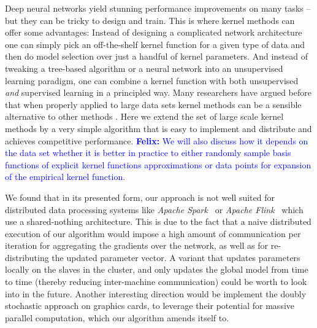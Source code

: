 \documentclass{article} %
\newcommand{\felix}[1]{\textcolor{blue}{{\bf Felix:} #1}}
\begin{document}

Deep neural networks yield stunning performance improvements on many tasks -- but they can be tricky to design and train.
This is where kernel methods can offer some advantages: Instead of designing a complicated network architecture one can simply pick an off-the-shelf kernel function for a given type of data and then do model selection over just a handful of kernel parameters. And instead of tweaking a tree-based algorithm or a neural network into an unsupervised learning paradigm, one can combine a kernel function with both unsupervised {\em and} supervised learning in a principled way.  
Many researchers have argued before that when properly applied to large data sets kernel methods can be a sensible alternative to other methods \cite{Lu2014}. Here we extend the set of large scale kernel methods by a very simple algorithm that is easy to implement and distribute and achieves competitive performance. 
\felix{We will also discuss how it depends on the data set whether it is better in practice to either randomly sample basis functions of explicit kernel functions approximations or data points for expansion of the empirical kernel function. }

We found that in its presented form, our approach is not well suited for distributed data processing systems like \textit{Apache Spark}~\cite{Zaharia2012} or \textit{Apache Flink}~\cite{Alexandrov2014} which use a shared-nothing architecture. This is due to the fact that a naive distributed execution of our algorithm would impose a high amount of communication per iteration for aggregating the gradients over the network, as well as for re-distributing the updated parameter vector. A variant that updates parameters locally on the slaves in the cluster, and only updates the global model from time to time (thereby reducing inter-machine communication) could be worth to look into in the future. Another interesting direction would be implement the doubly stochastic approach on graphics cards, to leverage their potential for massive parallel computation, which our algorithm amends itself to.

\newpage

{\small
  
  }
\end{document}
